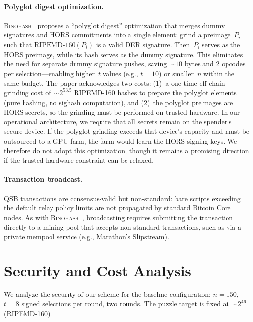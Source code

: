 \documentclass[11pt, a4paper]{article}
\begin{document}
\paragraph{Polyglot digest optimization.}
\textsc{Binohash}~\cite[Appendix~D]{linus2024binohash} proposes a ``polyglot digest'' optimization that merges dummy signatures and HORS commitments into a single element: grind a preimage~$P_i$ such that $\text{RIPEMD-160}(P_i)$ is a valid DER signature. Then~$P_i$ serves as the HORS preimage, while its hash serves as the dummy signature. This eliminates the need for separate dummy signature pushes, saving~${\sim}10$ bytes and 2 opcodes per selection---enabling higher~$t$ values (e.g., $t = 10$) or smaller~$n$ within the same budget. The paper acknowledges two costs: (1)~a one-time off-chain grinding cost of~${\sim}2^{53.5}$ RIPEMD-160 hashes to prepare the polyglot elements (pure hashing, no sighash computation), and (2)~the polyglot preimages are HORS secrets, so the grinding must be performed on trusted hardware. In our operational architecture, we require that all secrets remain on the spender's secure device. If the polyglot grinding exceeds that device's capacity and must be outsourced to a GPU farm, the farm would learn the HORS signing keys. We therefore do not adopt this optimization, though it remains a promising direction if the trusted-hardware constraint can be relaxed.

\paragraph{Transaction broadcast.}
QSB transactions are consensus-valid but non-standard: bare scripts exceeding the default relay policy limits are not propagated by standard Bitcoin Core nodes. As with \textsc{Binohash}~\cite[Section~6]{linus2024binohash}, broadcasting requires submitting the transaction directly to a mining pool that accepts non-standard transactions, such as via a private mempool service (e.g., Marathon's Slipstream).

\section{Security and Cost Analysis}
\label{sec:security-cost}

We analyze the security of our scheme for the baseline configuration: $n = 150$, $t = 8$ signed selections per round, two rounds. The puzzle target is fixed at~${\sim}2^{46}$ (RIPEMD-160).
\end{document}
